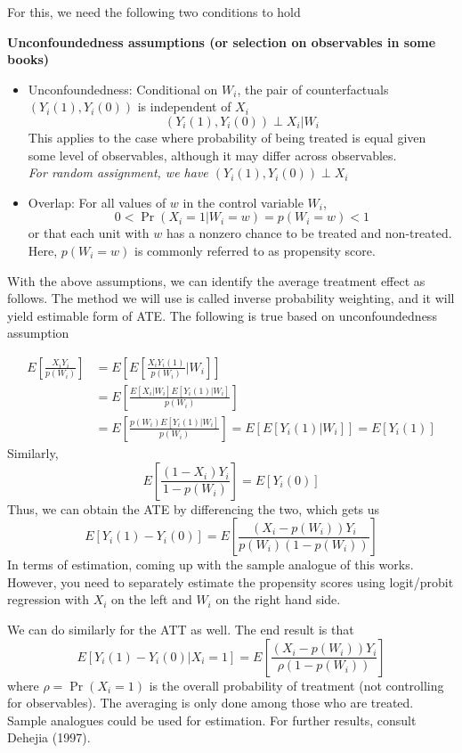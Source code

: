 \documentclass[12pt]{article}
\theoremstyle{definition}
\theoremstyle{property}
\theoremstyle{assumption}
\theoremstyle{example}
\theoremstyle{comment}
\begin{document}
For this, we need the following two conditions to hold
\begin{mdframed}[backgroundcolor =blue!10]
\textbf{Unconfoundedness assumptions (or selection on observables in some books)}
\begin{itemize}
\item Unconfoundedness: Conditional on $W_i$, the pair of counterfactuals $(Y_i(1),Y_i(0))$ is independent of $X_i$
\[
(Y_i(1),Y_i(0)) \perp X_i|W_i
\]
This applies to the case where probability of being treated is equal given some level of observables, although it may differ across observables. \\
\textit{For random assignment, we have $(Y_i(1),Y_i(0)) \perp X_i$}
\item Overlap: For all values of $w$ in the control variable $W_i$, 
\[
0<\Pr(X_i=1|W_i=w)=p(W_i=w)<1
\]
or that each unit with $w$ has a nonzero chance to be treated and non-treated. Here, $p(W_i=w)$ is commonly referred to as propensity score.
\end{itemize}
\end{mdframed}
With the above assumptions, we can identify the average treatment effect as follows. The method we will use is called inverse probability weighting, and it will yield estimable form of ATE. The following is true based on unconfoundedness assumption

\begin{align*}
E\left[\frac{X_iY_i}{p(W_i)}\right]&=E\left[E\left[\frac{X_iY_i(1)}{p(W_i)}|W_i\right]\right]\\
&=E\left[\frac{E[X_i|W_i]E[Y_i(1)|W_i]}{p(W_i)}\right]\\
&=E\left[\frac{p(W_i)E[Y_i(1)|W_i]}{p(W_i)}\right]=E[E[Y_i(1)|W_i]]=E[Y_i(1)]
\end{align*}
Similarly, 
\[
E\left[\frac{(1-X_i)Y_i}{1-p(W_i)}\right]= E[Y_i(0)]
\]
Thus, we can obtain the ATE by differencing the two, which gets us
\[
E[Y_i(1)-Y_i(0)]= E\left[ \frac{(X_i-p(W_i))Y_i}{p(W_i)(1-p(W_i))}\right]
\]
In terms of estimation, coming up with the sample analogue of this works. However, you need to separately estimate the propensity scores using logit/probit regression with $X_i$ on the left and $W_i$ on the right hand side.
\par
We can do similarly for the ATT as well. The end result is that
\[
E[Y_i(1)-Y_i(0)|X_i=1]= E\left[ \frac{(X_i-p(W_i))Y_i}{\rho(1-p(W_i))}\right]
\]
where $\rho=\Pr(X_i=1)$ is the overall probability of treatment (not controlling for observables). The averaging is only done among those who are treated. Sample analogues could be used for estimation. For further results, consult Dehejia (1997).
\end{document}
